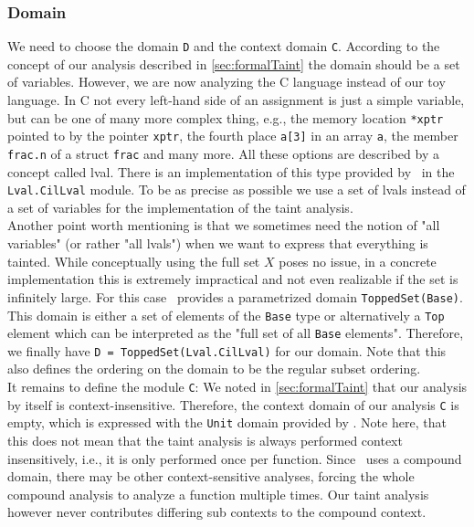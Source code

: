       \subsubsection{Domain}
        We need to choose the domain \texttt{D} and the context domain \texttt{C}. According to the concept of our analysis described in \autoref{sec:formalTaint} the domain should be a set of variables. However, we are now analyzing the C language instead of our toy language. In C not every left-hand side of an assignment is just a simple variable, but can be one of many more complex thing, e.g., the memory location \texttt{*xptr} pointed to by the pointer \texttt{xptr}, the fourth place \texttt{a[3]} in an array \texttt{a}, the member \texttt{frac.n} of a struct \texttt{frac} and many more. All these options are described by a concept called \ac{lval}. There is an implementation of this type provided by \gob\ in the \texttt{Lval.CilLval} module. To be as precise as possible we use a set of \ac{lval}s instead of a set of variables for the implementation of the taint analysis.\\
        Another point worth mentioning is that we sometimes need the notion of "all variables" (or rather "all \ac{lval}s") when we want to express that everything is tainted. While conceptually using the full set $X$ poses no issue, in a concrete implementation this is extremely impractical and not even realizable if the set is infinitely large. For this case \gob\ provides a parametrized domain \texttt{ToppedSet(Base)}. This domain is either a set of elements of the \texttt{Base} type or alternatively a \texttt{Top} element which can be interpreted as the "full set of all \texttt{Base} elements". Therefore, we finally have \texttt{D = ToppedSet(Lval.CilLval)} for our domain. Note that this also defines the ordering on the domain to be the regular subset ordering.\\
        It remains to define the module \texttt{C}: We noted in \autoref{sec:formalTaint} that our analysis by itself is context-insensitive. Therefore, the context domain of our analysis \texttt{C} is empty, which is expressed with the \texttt{Unit} domain provided by \gob. Note here, that this does not mean that the taint analysis is always performed context insensitively, i.e., it is only performed once per function. Since \gob\ uses a compound domain, there may be other context-sensitive analyses, forcing the whole compound analysis to analyze a function multiple times. Our taint analysis however never contributes differing sub contexts to the compound context.

